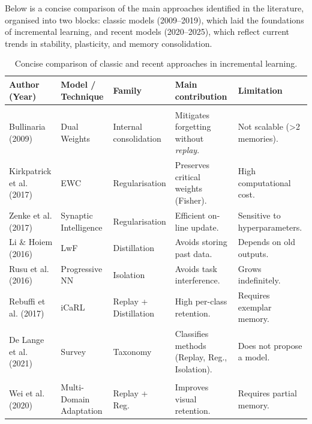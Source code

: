 Below is a concise comparison of the main approaches identified in the literature, organised into two blocks: classic models (2009–2019), which laid the foundations of incremental learning, and recent models (2020–2025), which reflect current trends in stability, plasticity, and memory consolidation.

\setlength{\tabcolsep}{6pt}
\renewcommand{\arraystretch}{1.15}

\begin{table}[H]
\centering
\small
\caption{Concise comparison of classic and recent approaches in incremental learning.}
\label{tab:state_art_summary}
\begin{tabularx}{\textwidth}{
  >{\raggedright\arraybackslash}p{3.5cm}
  >{\raggedright\arraybackslash}p{2.8cm}
  >{\raggedright\arraybackslash}p{2.8cm}
  >{\raggedright\arraybackslash}X
  >{\raggedright\arraybackslash}X}
\toprule
\textbf{Author (Year)} & \textbf{Model / Technique} & \textbf{Family} & \textbf{Main contribution} & \textbf{Limitation} \\
\midrule
\multicolumn{5}{@{}l}{\textbf{Classic Models (2009–2019)}}\\[0.25em]
Bullinaria (2009) \cite{bullinaria2009} & Dual Weights & Internal consolidation & Mitigates forgetting without \textit{replay}. & Not scalable (>2 memories). \\
Kirkpatrick et al. (2017) \cite{kirkpatrick2017overcoming} & EWC & Regularisation & Preserves critical weights (Fisher). & High computational cost. \\
Zenke et al. (2017) \cite{zenke2017continual} & Synaptic Intelligence & Regularisation & Efficient on-line update. & Sensitive to hyperparameters. \\
Li \& Hoiem (2016) \cite{li2016lwf} & LwF & Distillation & Avoids storing past data. & Depends on old outputs. \\
Rusu et al. (2016) \cite{rusu2016pnn} & Progressive NN & Isolation & Avoids task interference. & Grows indefinitely. \\
Rebuffi et al. (2017) \cite{rebuffi2017icarl} & iCaRL & Replay + Distillation & High per-class retention. & Requires exemplar memory. \\
De Lange et al. (2021) \cite{de2021continual} & Survey & Taxonomy & Classifies methods (Replay, Reg., Isolation). & Does not propose a model. \\
\midrule
\multicolumn{5}{@{}l}{\textbf{Recent Models (2020–2025)}}\\[0.25em]
Wei et al. (2020) \cite{WEI2020} & Multi-Domain Adaptation & Replay + Reg. & Improves visual retention. & Requires partial memory. \\

\end{tabularx}
\end{table}
